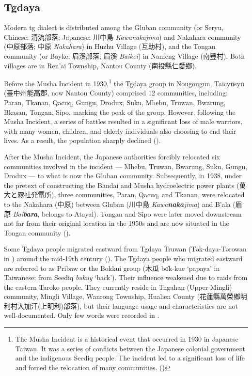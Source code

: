 \subsection{Tgdaya} \label{sec:tgintro}

Modern \acl{tg} dialect is distributed among the Gluban community (or Seryu, Chinese: 清流部落; Japanese: 川中島 \textit{Kawanakajima}) and Nakahara community (中原部落; 中原 \textit{Nakahara}) in Huzhu Village (互助村), and the Tongan community (or Bayke, 眉溪部落; 眉溪 \textit{Baikei}) in Nanfeng Village (南豐村). Both villages are in Ren'ai Township, Nantou County (南投縣仁愛鄉). 

Before the Musha Incident in 1930,\footnote{The Musha Incident is a historical event that occurred in 1930 in Japanese Taiwan. It was a series of conflicts between the Japanese colonial government and the indigenous Seediq people. The incident led to a significant loss of life and forced the relocation of many communities. (\cite{TengChian2023musha})} the Tgdaya group in Nougougun, Taicyūsyū (臺中州能高郡, now Nantou County) comprised 12 communities, including: Paran, Tkanan, Qacuq, Gungu, Drodux, Suku, Mhebu, Truwan, Bwarung, Bkasan, Tongan, Sipo, marking the peak of the group. However, following the Musha Incident, a series of battles resulted in a significant loss of male warriors, with many women, children, and elderly individuals also choosing to end their lives. As a result, the population sharply declined (\cite{TengChian2023musha}).

After the Musha Incident, the Japanese authorities forcibly relocated six communities involved in the incident --- Mhebu, Truwan, Bwarung, Suku, Gungu, Drodux --- to what is now the Gluban community. Subsequently, in 1938, under the pretext of constructing the Bandai and Musha hydroelectric power plants (萬大と霧社発電所), three communities, Paran, Qacuq, and Tkanan, were relocated to the Nakahara (中原) between Gluban (川中島 \textit{Kawa\textbf{naka}jima}) and B'ala (眉原 \textit{Bai\textbf{bara}}, belongs to Atayal). Tongan and Sipo were later moved downstream not far from their original location in the 1950s and are now situated in the Tongan community (\cite{TengChian2023musha,iwanperin2005tongan}).

Some Tgdaya people migrated eastward from Tgdaya Truwan (Tək-daya-Tərowan in \cite{utsurikawaetal1935}) around the mid-19th century (\cite{liao1977Sedtheruy}). The Tgdaya people who migrated eastward are referred to as Pribaw or the Bokkui group (木瓜 bo̍k-kue `papaya' in Taiwanese; from Seediq \textit{bukuy} `back'). Their influence weakened due to raids from the eastern Taroko people. They currently reside in  Tngahan (Upper Mingli) community, Mingli Village, Wanrong Township, Hualien County (花蓮縣萬榮鄉明利村大加汗(上明利)部落), but their language usage and characteristics are not well-documented. Only few words were recorded in \textcite{tashiro1900easterntw}.

